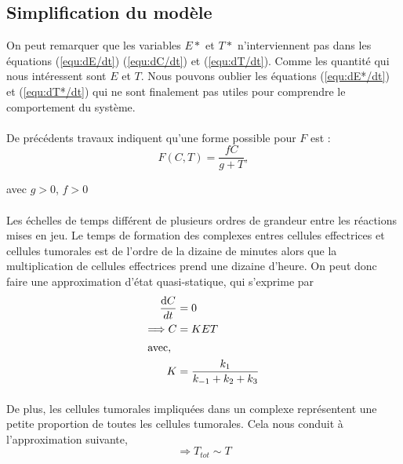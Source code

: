 \documentclass[12pt]{article}
\newcommand{\deriv}{\mathrm{d}}
\begin{document}
\subsection{Simplification du modèle}
On peut remarquer que les variables $E*$ et $T*$ n'interviennent pas dans les équations (\ref{equ:dE/dt}) (\ref{equ:dC/dt}) et (\ref{equ:dT/dt}). Comme les quantité qui nous intéressent sont $E$ et $T$. Nous pouvons oublier les équations (\ref{equ:dE*/dt}) et (\ref{equ:dT*/dt}) qui ne sont finalement pas utiles pour comprendre le comportement du système. 

\paragraph*{} De précédents travaux indiquent qu'une forme possible pour $F$ est : 
\begin{equation}
    F(C, T) = \frac{fC}{g + T}, \label{equ::F}
\end{equation}

avec $g>0$, $f>0$

\paragraph*{}Les échelles de temps différent de plusieurs ordres de grandeur entre les réactions mises en jeu. Le temps de formation des complexes entres cellules effectrices et cellules tumorales est de l'ordre de la dizaine de minutes alors que la multiplication de cellules effectrices prend une dizaine d'heure. On peut donc faire une approximation d'état quasi-statique, qui s'exprime par
\begin{align}
    \frac{\deriv C}{dt} &=0 \notag\\
    \Longrightarrow C&= KET \label{equ::C}\\
    \intertext{avec, }
    K &=\frac{k_1}{k_{-1} + k_2+k_3}\notag
\end{align}


\paragraph{}De plus, les cellules tumorales impliquées dans un complexe représentent une petite proportion de toutes les cellules tumorales. Cela nous conduit à l'approximation suivante, 
\begin{equation}
    \Longrightarrow T_{tot} \sim T \label{equ::Ttot}
\end{equation} 
\end{document}
